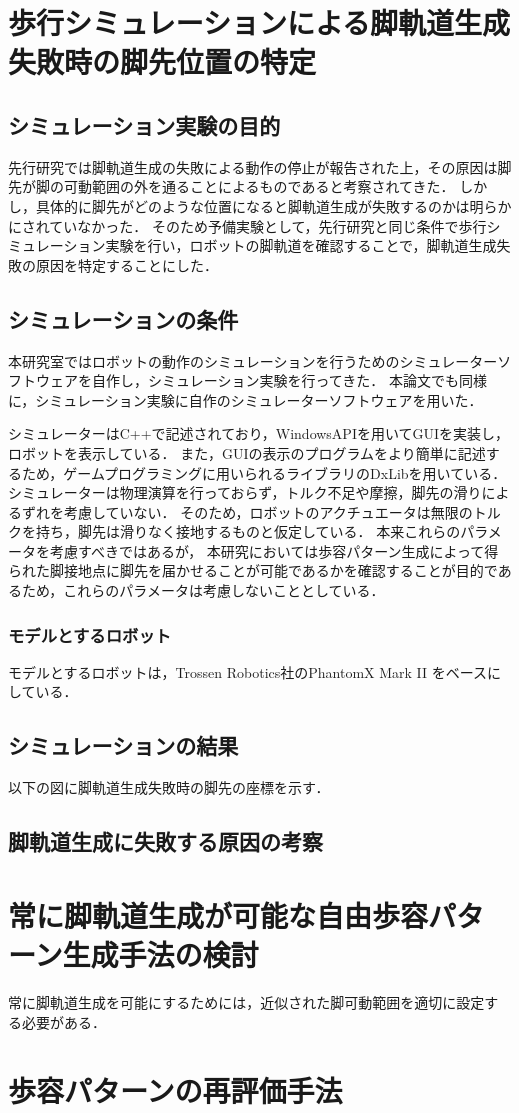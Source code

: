 \section{歩行シミュレーションによる脚軌道生成失敗時の脚先位置の特定}

\subsection{シミュレーション実験の目的}
先行研究では脚軌道生成の失敗による動作の停止が報告された上，その原因は脚先が脚の可動範囲の外を通ることによるものであると考察されてきた．
しかし，具体的に脚先がどのような位置になると脚軌道生成が失敗するのかは明らかにされていなかった．
そのため予備実験として，先行研究\cite{Hato_Graph_search}と同じ条件で歩行シミュレーション実験を行い，ロボットの脚軌道を確認することで，脚軌道生成失敗の原因を特定することにした．

\subsection{シミュレーションの条件}
本研究室ではロボットの動作のシミュレーションを行うためのシミュレーターソフトウェアを自作し，シミュレーション実験を行ってきた．
本論文でも同様に，シミュレーション実験に自作のシミュレーターソフトウェアを用いた．

シミュレーターはC++で記述されており，WindowsAPIを用いてGUIを実装し，ロボットを表示している．
また，GUIの表示のプログラムをより簡単に記述するため，ゲームプログラミングに用いられるライブラリのDxLib\cite{Dxlib_Web}を用いている．
シミュレーターは物理演算を行っておらず，トルク不足や摩擦，脚先の滑りによるずれを考慮していない．
そのため，ロボットのアクチュエータは無限のトルクを持ち，脚先は滑りなく接地するものと仮定している．
本来これらのパラメータを考慮すべきではあるが，
本研究においては歩容パターン生成によって得られた脚接地点に脚先を届かせることが可能であるかを確認することが目的であるため，これらのパラメータは考慮しないこととしている．

\subsubsection{モデルとするロボット}
モデルとするロボットは，Trossen Robotics社のPhantomX Mark I\hspace{-1.2pt}I \cite{cita:phantom_x_mark_2}をベースにしている．
\subsection{シミュレーションの結果}
以下の図に脚軌道生成失敗時の脚先の座標を示す．

\subsection{脚軌道生成に失敗する原因の考察}

\section{常に脚軌道生成が可能な自由歩容パターン生成手法の検討}
常に脚軌道生成を可能にするためには，近似された脚可動範囲を適切に設定する必要がある．


\section{歩容パターンの再評価手法}

